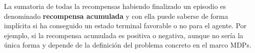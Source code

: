 \documentclass[11pt,fleqn]{book} %
\begin{document}
La sumatoria de todas la recompensas habiendo finalizado un episodio es denominado \textbf{recompensa acumulada} y con ella puede saberse de forma implícita si ha conseguido un estado terminal favorable o no para el agente. Por ejemplo, si la recompensa acumulada es positiva o negativa, aunque no sería la única forma y depende de la definición del problema concreto en el marco MDPs. \\

%
%
%
\end{document}
